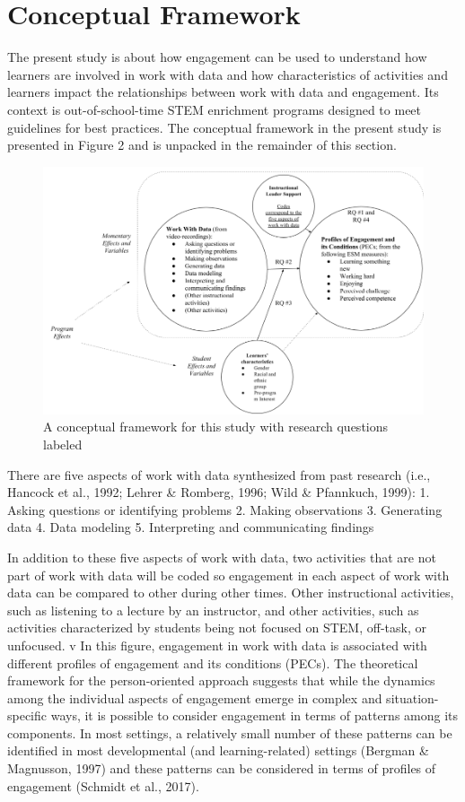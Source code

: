 \documentclass[]{msu-thesis}
\theoremstyle{definition}
\theoremstyle{definition}
\theoremstyle{definition}
\theoremstyle{remark}
\begin{document}
\section{Conceptual Framework}\label{conceptual-framework}

The present study is about how engagement can be used to understand how
learners are involved in work with data and how characteristics of
activities and learners impact the relationships between work with data
and engagement. Its context is out-of-school-time STEM enrichment
programs designed to meet guidelines for best practices. The conceptual
framework in the present study is presented in Figure 2 and is unpacked
in the remainder of this section.

\begin{figure}

{\centering \includegraphics[width=0.8\linewidth]{images/figure2} 

}

\caption{A conceptual framework for this study with research questions labeled}\label{fig:unnamed-chunk-2}
\end{figure}

There are five aspects of work with data synthesized from past research
(i.e., Hancock et al., 1992; Lehrer \& Romberg, 1996; Wild \& Pfannkuch,
1999): 1. Asking questions or identifying problems 2. Making
observations 3. Generating data 4. Data modeling 5. Interpreting and
communicating findings

In addition to these five aspects of work with data, two activities that
are not part of work with data will be coded so engagement in each
aspect of work with data can be compared to other during other times.
Other instructional activities, such as listening to a lecture by an
instructor, and other activities, such as activities characterized by
students being not focused on STEM, off-task, or unfocused. v In this
figure, engagement in work with data is associated with different
profiles of engagement and its conditions (PECs). The theoretical
framework for the person-oriented approach suggests that while the
dynamics among the individual aspects of engagement emerge in complex
and situation-specific ways, it is possible to consider engagement in
terms of patterns among its components. In most settings, a relatively
small number of these patterns can be identified in most developmental
(and learning-related) settings (Bergman \& Magnusson, 1997) and these
patterns can be considered in terms of profiles of engagement (Schmidt
et al., 2017).
\end{document}
